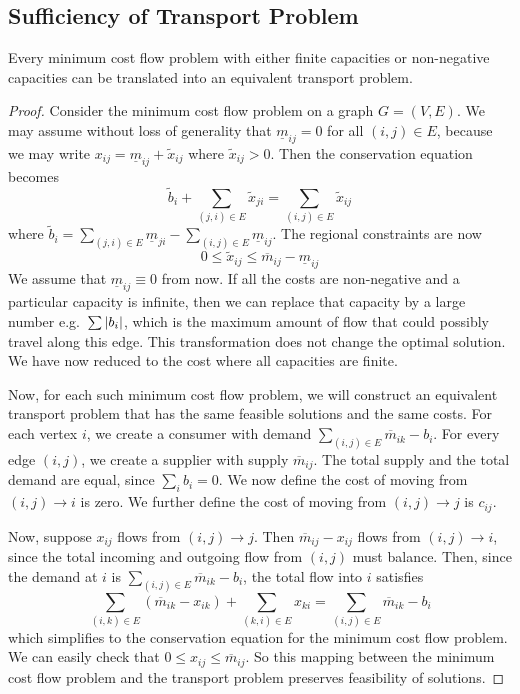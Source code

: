 \subsection{Sufficiency of Transport Problem}
\begin{theorem}
    Every minimum cost flow problem with either finite capacities or non-negative capacities can be translated into an equivalent transport problem.
\end{theorem}
\begin{proof}
    Consider the minimum cost flow problem on a graph \( G = (V, E) \).
    We may assume without loss of generality that \( \underline m_{ij} = 0 \) for all \( (i,j) \in E \), because we may write \( x_{ij} = \underline m_{ij} + \widetilde x_{ij} \) where \( \widetilde x_{ij} > 0 \).
    Then the conservation equation becomes
    \[ \widetilde{b}_i + \sum_{(j,i) \in E}\widetilde{x}_{ji} = \sum_{(i,j) \in E}\widetilde{x}_{ij} \]
    where \( \widetilde{b}_i = \sum_{(j,i) \in E}\underline{m}_{ji} - \sum_{(i,j) \in E}\underline{m}_{ij} \).
    The regional constraints are now
    \[ 0 \leq \widetilde{x}_{ij} \leq \overline m_{ij} - \underline m_{ij} \]
    We assume that \( \underline m_{ij} \equiv 0 \) from now.
    If all the costs are non-negative and a particular capacity is infinite, then we can replace that capacity by a large number e.g.\ \( \sum \abs{b_i} \),
    which is the maximum amount of flow that could possibly travel along this edge.
    This transformation does not change the optimal solution.
    We have now reduced to the cost where all capacities are finite.

    \medskip\noindent Now, for each such minimum cost flow problem, we will construct an equivalent transport problem that has the same feasible solutions and the same costs.
    For each vertex \( i \), we create a consumer with demand \( \sum_{(i,j) \in E} \overline m_{ik} - b_i \).
    For every edge \( (i,j) \), we create a supplier with supply \( \overline m_{ij} \).
    The total supply and the total demand are equal, since \( \sum_i b_i = 0 \).
    We now define the cost of moving from \( (i,j) \to i \) is zero. We further define the cost of moving from \( (i,j) \to j \) is \( c_{ij} \).

    \medskip\noindent Now, suppose \( x_{ij} \) flows from \( (i,j) \to j \).
    Then \( \overline m_{ij} - x_{ij} \) flows from \( (i,j) \to i \), since the total incoming and outgoing flow from \( (i,j) \) must balance.
    Then, since the demand at \( i \) is \( \sum_{(i,j) \in E} \overline m_{ik} - b_i \), the total flow into \( i \) satisfies
    \[ \sum_{(i,k) \in E} (\overline m_{ik} - x_{ik}) + \sum_{(k,i) \in E} x_{ki} = \sum_{(i,j) \in E} \overline m_{ik} - b_i \]
    which simplifies to the conservation equation for the minimum cost flow problem.
    We can easily check that \( 0 \leq x_{ij} \leq \overline m_{ij} \).
    So this mapping between the minimum cost flow problem and the transport problem preserves feasibility of solutions.


\end{proof}
